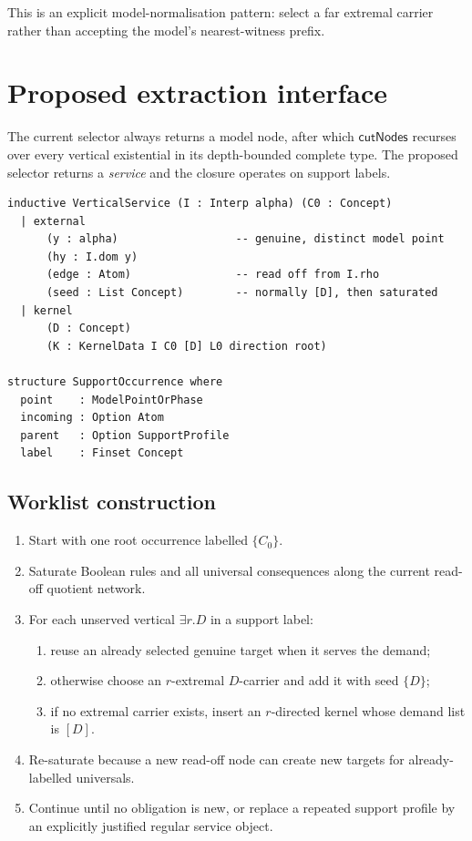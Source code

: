 \documentclass[11pt,letterpaper]{article}
\newcommand{\cutNodes}{\ensuremath{\mathsf{cutNodes}}}
\theoremstyle{definition}
\theoremstyle{plain}
\theoremstyle{remark}
\begin{document}
This is an explicit model-normalisation pattern: select a far extremal carrier
rather than accepting the model's nearest-witness prefix.

\section{Proposed extraction interface}

The current selector always returns a model node, after which \cutNodes{}
recurses over every vertical existential in its depth-bounded complete type.
The proposed selector returns a \emph{service} and the closure operates on
support labels.

\begin{lstlisting}[language=LeanSketch,caption={Lean-style interface sketch; not compiled.}]
inductive VerticalService (I : Interp alpha) (C0 : Concept)
  | external
      (y : alpha)                  -- genuine, distinct model point
      (hy : I.dom y)
      (edge : Atom)                -- read off from I.rho
      (seed : List Concept)        -- normally [D], then saturated
  | kernel
      (D : Concept)
      (K : KernelData I C0 [D] L0 direction root)

structure SupportOccurrence where
  point    : ModelPointOrPhase
  incoming : Option Atom
  parent   : Option SupportProfile
  label    : Finset Concept
\end{lstlisting}

\subsection{Worklist construction}

\begin{enumerate}
  \item Start with one root occurrence labelled $\{C_0\}$.
  \item Saturate Boolean rules and all universal consequences along the current
        read-off quotient network.
  \item For each unserved vertical $\exists r.D$ in a support label:
    \begin{enumerate}[label=(\alph*)]
      \item reuse an already selected genuine target when it serves the demand;
      \item otherwise choose an $r$-extremal $D$-carrier and add it with seed
            $\{D\}$;
      \item if no extremal carrier exists, insert an $r$-directed kernel whose
            demand list is $[D]$.
    \end{enumerate}
  \item Re-saturate because a new read-off node can create new targets for
        already-labelled universals.
  \item Continue until no obligation is new, or replace a repeated support
        profile by an explicitly justified regular service object.
\end{enumerate}
\end{document}
